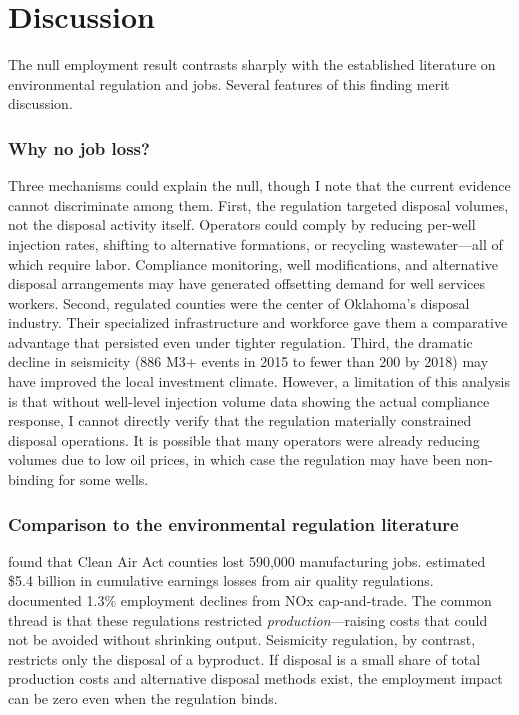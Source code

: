\documentclass[12pt]{article}
\begin{document}
\section{Discussion}

The null employment result contrasts sharply with the established literature on environmental regulation and jobs. Several features of this finding merit discussion.

\subsubsection*{Why no job loss?} Three mechanisms could explain the null, though I note that the current evidence cannot discriminate among them. First, the regulation targeted disposal volumes, not the disposal activity itself. Operators could comply by reducing per-well injection rates, shifting to alternative formations, or recycling wastewater---all of which require labor. Compliance monitoring, well modifications, and alternative disposal arrangements may have generated offsetting demand for well services workers. Second, regulated counties were the center of Oklahoma's disposal industry. Their specialized infrastructure and workforce gave them a comparative advantage that persisted even under tighter regulation. Third, the dramatic decline in seismicity (886 M3+ events in 2015 to fewer than 200 by 2018) may have improved the local investment climate. However, a limitation of this analysis is that without well-level injection volume data showing the actual compliance response, I cannot directly verify that the regulation materially constrained disposal operations. It is possible that many operators were already reducing volumes due to low oil prices, in which case the regulation may have been non-binding for some wells.

\subsubsection*{Comparison to the environmental regulation literature} \citet{greenstone2002} found that Clean Air Act counties lost 590,000 manufacturing jobs. \citet{walker2013} estimated \$5.4 billion in cumulative earnings losses from air quality regulations. \citet{curtis2018} documented 1.3\% employment declines from NOx cap-and-trade. The common thread is that these regulations restricted \emph{production}---raising costs that could not be avoided without shrinking output. Seismicity regulation, by contrast, restricts only the disposal of a byproduct. If disposal is a small share of total production costs and alternative disposal methods exist, the employment impact can be zero even when the regulation binds.
\end{document}
